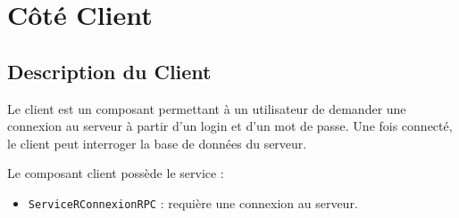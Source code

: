 \pagestyle{fancy}
\section{Côté Client}
\subsection{Description du Client}
Le client est un composant permettant  à un utilisateur de demander une connexion au serveur à partir d'un login et d'un mot de passe. Une fois connecté, le client peut interroger la base de données du serveur.
 
Le composant client possède le service : 
\begin{itemize}
\item 
  \verb+ServiceRConnexionRPC+ : requière une connexion au serveur.
\end{itemize}
